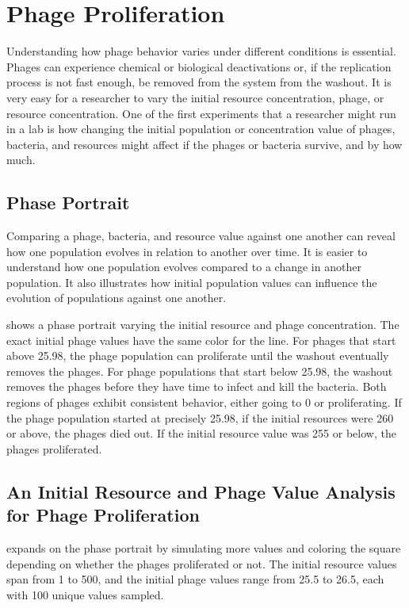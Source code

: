\section{Phage Proliferation}
Understanding how phage behavior varies under different conditions is essential. 
Phages can experience chemical or biological deactivations or, if the replication process is not fast enough, be removed from the system from the washout. 
It is very easy for a researcher to vary the initial resource concentration, phage, or resource concentration. 
One of the first experiments that a researcher might run in a lab is how changing the initial population or concentration value of phages, bacteria, and resources might affect if the phages or bacteria survive, and by how much. 

\subsection{Phase Portrait}
\label{sec:results:phase_portrait}
Comparing a phage, bacteria, and resource value against one another can reveal how one population evolves in relation to another over time. 
It is easier to understand how one population evolves compared to a change in another population. 
It also illustrates how initial population values can influence the evolution of populations against one another. 

 shows a phase portrait varying the initial resource and phage concentration. 
The exact initial phage values have the same color for the line. 
For phages that start above 25.98, the phage population can proliferate until the washout eventually removes the phages. 
For phage populations that start below 25.98, the washout removes the phages before they have time to infect and kill the bacteria. 
Both regions of phages exhibit consistent behavior, either going to 0 or proliferating. 
If the phage population started at precisely 25.98, if the initial resources were 260 or above, the phages died out. 
If the initial resource value was 255 or below, the phages proliferated. 

\subsection{An Initial Resource and Phage Value Analysis for Phage Proliferation}
 expands on the phase portrait by simulating more values and coloring the square depending on whether the phages proliferated or not. 
The initial resource values span from 1 to 500, and the initial phage values range from 25.5 to 26.5, each with 100 unique values sampled.

